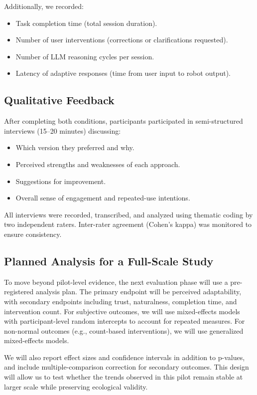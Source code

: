 Additionally, we recorded:
\begin{itemize}
\item Task completion time (total session duration).
\item Number of user interventions (corrections or clarifications requested).
\item Number of LLM reasoning cycles per session.
\item Latency of adaptive responses (time from user input to robot output).
\end{itemize}

\subsection{Qualitative Feedback}

After completing both conditions, participants participated in semi-structured interviews (15–20 minutes) discussing:
\begin{itemize}
\item Which version they preferred and why.
\item Perceived strengths and weaknesses of each approach.
\item Suggestions for improvement.
\item Overall sense of engagement and repeated-use intentions.
\end{itemize}

All interviews were recorded, transcribed, and analyzed using thematic coding by two independent raters. Inter-rater agreement (Cohen's kappa) was monitored to ensure consistency.

\subsection{Planned Analysis for a Full-Scale Study}

To move beyond pilot-level evidence, the next evaluation phase will use a pre-registered analysis plan. The primary endpoint will be perceived adaptability, with secondary endpoints including trust, naturalness, completion time, and intervention count. For subjective outcomes, we will use mixed-effects models with participant-level random intercepts to account for repeated measures. For non-normal outcomes (e.g., count-based interventions), we will use generalized mixed-effects models.

We will also report effect sizes and confidence intervals in addition to p-values, and include multiple-comparison correction for secondary outcomes. This design will allow us to test whether the trends observed in this pilot remain stable at larger scale while preserving ecological validity.
